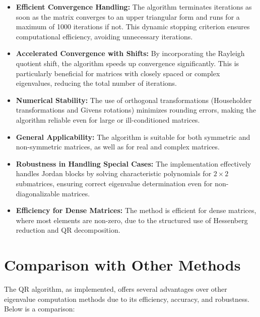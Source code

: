 \documentclass[12pt]{article}
\begin{document}
\begin{itemize}
    \item \textbf{Efficient Convergence Handling:} The algorithm terminates iterations as soon as the matrix converges to an upper triangular form and runs for a maximum of 1000 iterations if not. This dynamic stopping criterion ensures computational efficiency, avoiding unnecessary iterations.
    \item \textbf{Accelerated Convergence with Shifts:} By incorporating the Rayleigh quotient shift, the algorithm speeds up convergence significantly. This is particularly beneficial for matrices with closely spaced or complex eigenvalues, reducing the total number of iterations.
    \item \textbf{Numerical Stability:} The use of orthogonal transformations (Householder transformations and Givens rotations) minimizes rounding errors, making the algorithm reliable even for large or ill-conditioned matrices.
    \item \textbf{General Applicability:} The algorithm is suitable for both symmetric and non-symmetric matrices, as well as for real and complex matrices.
    \item \textbf{Robustness in Handling Special Cases:} The implementation effectively handles Jordan blocks by solving characteristic polynomials for \(2 \times 2\) submatrices, ensuring correct eigenvalue determination even for non-diagonalizable matrices.
    \item \textbf{Efficiency for Dense Matrices:} The method is efficient for dense matrices, where most elements are non-zero, due to the structured use of Hessenberg reduction and QR decomposition.
\end{itemize}

\section{Comparison with Other Methods}
The QR algorithm, as implemented, offers several advantages over other eigenvalue computation methods due to its efficiency, accuracy, and robustness. Below is a comparison:  
\end{document}
